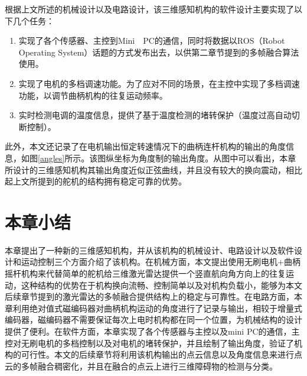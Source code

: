 根据上文所述的机械设计以及电路设计，该三维感知机构的软件设计主要实现了以下几个任务：

\begin{enumerate}
    \item 实现了各个传感器、主控到Mini　PC的通信，同时将数据以ROS（Robot Operating System）话题的方式发布出去，以供第二章节提到的多帧融合算法使用。
    \item 实现了电机的多档调速功能。为了应对不同的场景，在主控中实现了多档调速功能，以调节曲柄机构的往复运动频率。
    \item 实时检测电调的温度信息，提供了基于温度检测的堵转保护（温度过高自动切断控制）。
\end{enumerate}

此外，本文还记录了在电机输出恒定转速情况下的曲柄连杆机构的输出的角度信息，如图\ref{angles}所示。该图纵坐标为角度制的输出角度。从图中可以看出，本章所设计的三维感知机构其输出角度近似正弦曲线，并且没有较大的换向震动，相比起上文所提到的舵机的结构拥有稳定可靠的优势。


\section{本章小结}

本章提出了一种新的三维感知机构，并从该机构的机械设计、电路设计以及软件设计和运动控制三个方面介绍了该机构。在机械方面，本文提出使用无刷电机$+$曲柄摇杆机构来代替简单的舵机给三维激光雷达提供一个竖直航向角方向上的往复运动，这种结构的优势在于机构换向流畅、控制简单以及对机构负载小，能够为本文后续章节提到的激光雷达的多帧融合提供结构上的稳定与可靠性。在电路方面，本章利用绝对值式磁编码器对曲柄机构运动的角度进行了记录与输出，相较于增量式编码器，磁编码器不需要保证每次上电时机构都在同一个位置，为机械结构的设计提供了便利。在软件方面，本章实现了各个传感器与主控以及mini PC的通信，主控对无刷电机的多档控制以及对电机的堵转保护，并且绘制了输出角度，验证了机构的可行性。本文的后续章节将利用该机构输出的点云信息以及角度信息来进行点云的多帧融合稠密化，并且在融合的点云上进行三维障碍物的检测与分类。